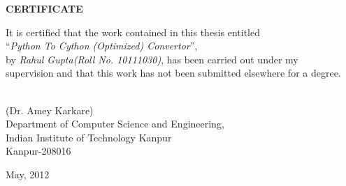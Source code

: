 \vspace*{1.0in}
\begin{center}
\begin{large}
{\bf CERTIFICATE}
\end{large}
\end{center}
\vskip 2cm
It is certified that the work contained in this thesis entitled \\``{{\textit{Python To Cython (Optimized) Convertor}}}'',\\ by {{\textit{Rahul Gupta(Roll No. 10111030)}}}, has been carried out under my \\supervision and that this work has not been submitted elsewhere for a degree.
\vskip 1in
\begin{flushleft}
		\hspace*{5.8cm}{\hrulefill}\\
		\hspace*{5.8cm}(Dr. Amey Karkare)\\
		\hspace*{5.8cm}Department of Computer Science and Engineering,\\ 
		\hspace*{5.8cm}Indian Institute of Technology Kanpur\\
		\hspace*{5.8cm}Kanpur-208016
\end{flushleft}
May, 2012

